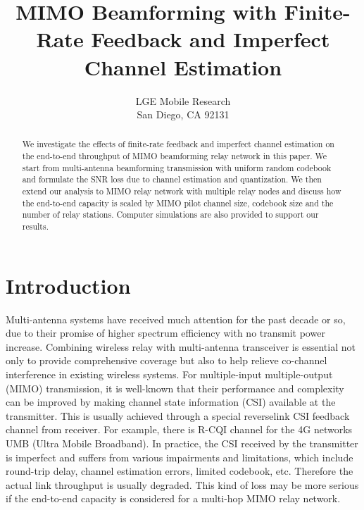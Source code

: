 \documentclass[10pt,fleqn, twocolumn]{IEEEtran}
\title{MIMO Beamforming with Finite-Rate Feedback and Imperfect Channel Estimation}
\author{LGE Mobile Research\\San Diego, CA 92131}
\date{}
\begin{document}
\maketitle
\begin{abstract}\small
We investigate the effects of finite-rate feedback and imperfect
channel estimation on the end-to-end throughput of MIMO
beamforming relay network in this paper. We start from
multi-antenna beamforming transmission with uniform random
codebook and formulate the SNR loss due to channel estimation and
quantization. We then extend our analysis to MIMO relay network
with multiple relay nodes and discuss how the end-to-end capacity
is scaled by MIMO pilot channel size, codebook size and the number
of relay stations. Computer simulations are also provided to
support our results.
\end{abstract}
\section{Introduction}
Multi-antenna systems have received much attention for the past
decade or so, due to their promise of higher spectrum efficiency
with no transmit power increase. Combining wireless relay with
multi-antenna transceiver is essential not only to provide
comprehensive coverage but also to help relieve co-channel
interference in existing wireless systems. For multiple-input
multiple-output (MIMO) transmission, it is well-known that their
performance and complexity can be improved by making channel state
information (CSI) available at the transmitter. This is usually
achieved through a special reverselink CSI feedback channel from
receiver. For example, there is R-CQI channel for the 4G networks
UMB (Ultra Mobile Broadband). In practice, the CSI received by the
transmitter is imperfect and suffers from various impairments and
limitations, which include round-trip delay, channel estimation
errors, limited codebook, etc. Therefore the actual link
throughput is usually degraded. This kind of loss may be more
serious if the end-to-end capacity is considered for a multi-hop
MIMO relay network.
\end{document}
